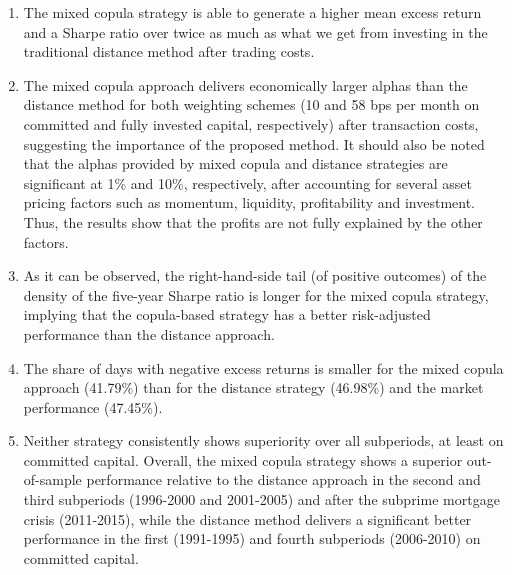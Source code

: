 \documentclass[a4paper]{article}
\begin{document}
	\begin{enumerate}
				
		
	\item The mixed copula strategy is able to generate a higher mean excess return and a Sharpe ratio over twice as much as what we get from investing in the traditional distance method after trading costs. 
	
		
		\vspace{0.3cm}
		
		\item 	The mixed copula approach delivers economically larger alphas than the distance method for both weighting schemes (10 and 58 bps per month on committed and fully invested capital, respectively) after transaction costs, suggesting the importance of the proposed method. It should also be noted that the alphas provided by mixed copula and distance strategies are significant at 1\% and 10\%, respectively, after accounting for several asset pricing factors such as momentum, liquidity, profitability and investment. Thus, the results show that the profits are not fully explained by the other factors.
		
		\vspace{0.3cm}
		
		\item As it can be observed, the right-hand-side tail (of positive outcomes) of the density of the five-year Sharpe ratio is longer for the mixed copula strategy, implying that the copula-based strategy has a better risk-adjusted performance than the distance approach.
		
		\vspace{0.3cm}
		
		\item The share of days with negative excess returns is smaller for the mixed copula approach (41.79\%) than for the distance strategy (46.98\%) and the market performance (47.45\%). 
		
	    \vspace{0.3cm}
		
		
		\item	Neither strategy consistently shows superiority over all subperiods, at least on committed capital. Overall, the mixed copula strategy shows a superior out-of-sample performance relative to the distance approach in the second and third subperiods (1996-2000 and 2001-2005) and after the subprime mortgage crisis (2011-2015), while the distance method delivers a significant better performance in the first (1991-1995) and fourth subperiods (2006-2010) on committed capital. 
		
	\end{enumerate}
\end{document}
